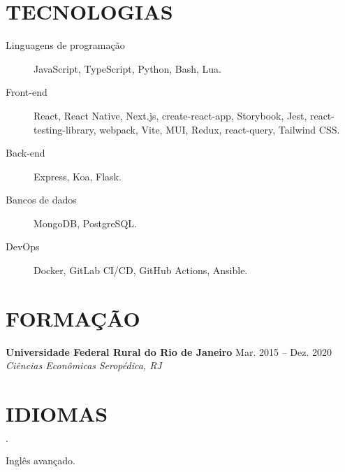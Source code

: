 \documentclass[12pt]{article}
\newenvironment{tightlist}
  {\begin{list}
    {$\cdot$}
    {
      \setlength{\leftmargin}{0em}
      \setlength{\itemsep}{\smallskipamount}
    }
  }
{\end{list}}
\begin{document}
\section*{TECNOLOGIAS}

\begin{description}
  \item[Linguagens de programação] JavaScript, TypeScript, Python, Bash, Lua.
  \item[Front-end] React, React Native, Next.js, create-react-app,
    Storybook, Jest, react-testing-library, webpack, Vite,
    MUI, Redux, react-query, Tailwind CSS.
  \item[Back-end] Express, Koa, Flask.
  \item[Bancos de dados] MongoDB, PostgreSQL.
  \item[DevOps] Docker, GitLab CI/CD, GitHub Actions, Ansible.
\end{description}

\section*{FORMAÇÃO}

\textbf{Universidade Federal Rural do Rio de Janeiro} \hfill {Mar. 2015 -- Dez. 2020} \\
\textit{Ciências Econômicas} \hfill \textit{Seropédica, RJ} {\parfillskip=0pt\par}

\section*{IDIOMAS}

\begin{tightlist}
  \item Inglês avançado.
\end{tightlist}
\end{document}
